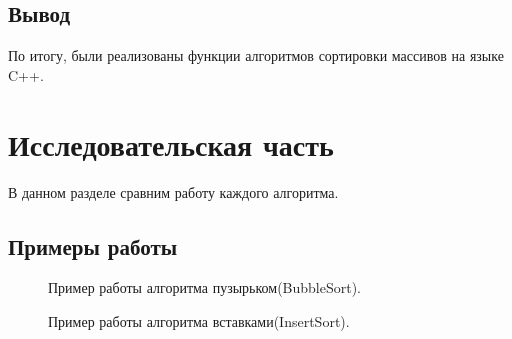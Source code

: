 \documentclass[12pt,a4paper]{report}
\begin{document}

\section*{Вывод}

По итогу, были реализованы функции алгоритмов сортировки массивов на языке C++.

\newpage
\chapter{Исследовательская часть} 

В данном разделе сравним работу каждого алгоритма.

\section{Примеры работы}

\begin{figure}[ht]
	\caption{Пример работы алгоритма пузырьком(BubbleSort).}
	\label{fig:image}
\end{figure}

\begin{figure}[ht]
	\caption{Пример работы алгоритма вставками(InsertSort).}
	\label{fig:image}
\end{figure}
\end{document}
